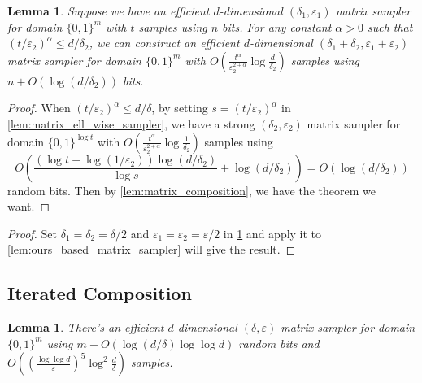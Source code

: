 \documentclass[11pt,letterpaper]{article}
\newtheorem{lemma}[theorem]{Lemma}
\newcommand{\eps}{\varepsilon}
\newcommand{\1}{\mathbbm{1}}
\newcommand{\zo}{\{0, 1\}}
\begin{document}
\begin{lemma}
    \label{lem:matrix_sample_size_reduction}
    Suppose we have an efficient $d$-dimensional $(\delta_1, \eps_1)$ matrix sampler for domain $\zo^m$ with $t$ samples using $n$ bits. For any constant $\alpha > 0$ such that $(t / \eps_2)^\alpha \le d / \delta_2$, we can construct an efficient $d$-dimensional $(\delta_1 + \delta_2, \eps_1 + \eps_2)$ matrix sampler for domain $\zo^m$ with $O(\frac{t^\alpha}{\eps_2^{2+\alpha}} \log \frac{d}{\delta_2} )$ samples using $n + O(\log (d / \delta_2))$ bits.
\end{lemma}
\begin{proof}
    When $(t / \eps_2)^\alpha \le d / \delta$, by setting $s = (t / \eps_2)^\alpha$ in \cref{lem:matrix_ell_wise_sampler}, we have a strong $(\delta_2, \eps_2)$ matrix sampler for domain $\zo^{\log t}$ with $O(\frac{{t}^\alpha}{\eps_2^{2+\alpha}}\log \frac{1}{\delta_2})$ samples using 
    \[
        O\left(\frac{(\log t + \log(1/\eps_2)) \log (d / \delta_2)}{\log s} + \log (d / \delta_2)\right) = O(\log (d / \delta_2))
    \]
    random bits. Then by \cref{lem:matrix_composition}, we have the theorem we want.
\end{proof}

\polydSampler*
\begin{proof}
    Set $\delta_1 = \delta_2 = \delta / 2$ and $\eps_1 = \eps_2 = \eps / 2$ in  \cref{lem:matrix_sample_size_reduction} and apply it to \cref{lem:ours_based_matrix_sampler} will give the result.
\end{proof}

\subsection{Iterated Composition}


















\begin{lemma}
    \label{lem:induction_lemma}
    There's an efficient $d$-dimensional $(\delta, \eps)$ matrix sampler for domain $\zo^m$ using $m + O(\log(d / \delta) \log\log d)$ random bits and $O((\frac{\log\log d}{\eps})^5\log^{2}\frac{d}{\delta})$ samples.
\end{lemma}
\end{document}
